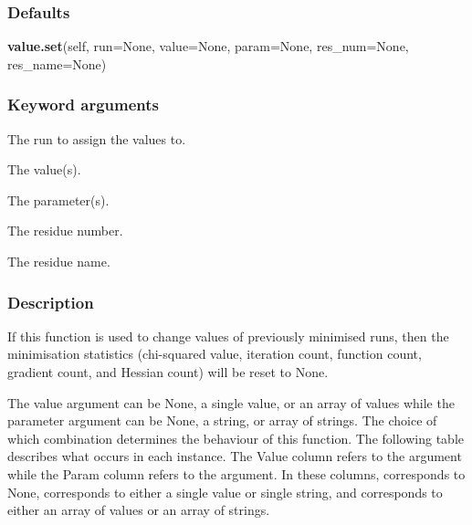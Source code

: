 \subsubsection{Defaults}

\textsf{\textbf{value.set}(self, run=None, value=None, param=None, res\_num=None, res\_name=None)}


\subsubsection{Keyword arguments}

  The run to assign the values to. 

  The value(s). 

  The parameter(s). 

  The residue number. 

  The residue name. 




\subsubsection{Description}

If this function is used to change values of previously minimised runs, then the minimisation statistics (chi-squared value, iteration count, function count, gradient count, and Hessian count) will be reset to None.


The value argument can be None, a single value, or an array of values while the parameter argument can be None, a string, or array of strings.  The choice of which combination determines the behaviour of this function.  The following table describes what occurs in each instance.  The Value column refers to the  argument while the Param column refers to the  argument.  In these columns,  corresponds to None,  corresponds to either a single value or single string, and  corresponds to either an array of values or an array of strings.


